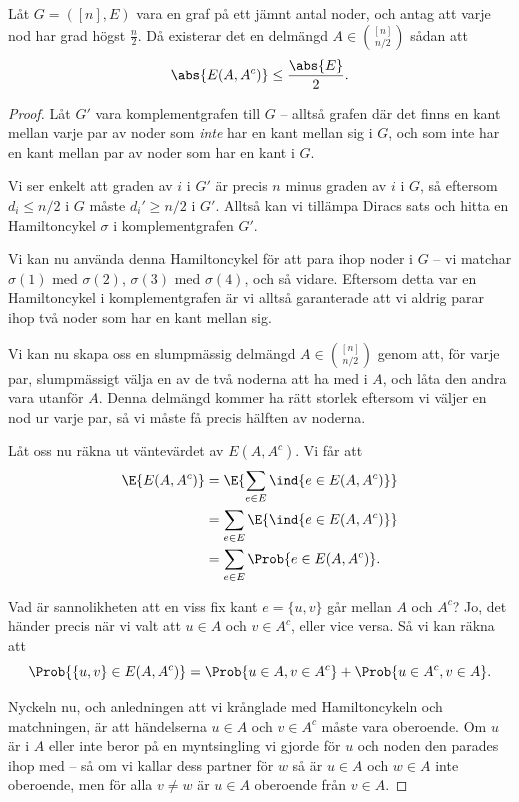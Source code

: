\documentclass[nobib]{tufte-handout}
\begin{document}
\begin{proposition}
  Låt $G = ([n], E)$ vara en graf på ett jämnt antal noder, och antag att varje nod har grad högst $\frac{n}{2}$. Då existerar det en delmängd $A \in \binom{[n]}{n/2}$ sådan att
  $$\abs{E(A, A^c)} \leq \frac{\abs{E}}{2}.$$ 

  \begin{proof}
    Låt $G'$ vara komplementgrafen till $G$ -- alltså grafen där det finns en kant mellan varje par av noder som \emph{inte} har en kant mellan sig i $G$, och som inte har en kant mellan par av noder som har en kant i $G$.

    Vi ser enkelt att graden av $i$ i $G'$ är precis $n$ minus graden av $i$ i $G$, så eftersom $d_i \leq n/2$ i $G$ måste $d_i' \geq n/2$ i $G'$. Alltså kan vi tillämpa Diracs sats och hitta en Hamiltoncykel $\sigma$ i komplementgrafen $G'$.

    Vi kan nu använda denna Hamiltoncykel för att para ihop noder i $G$ -- vi matchar $\sigma(1)$ med $\sigma(2)$, $\sigma(3)$ med $\sigma(4)$, och så vidare. Eftersom detta var en Hamiltoncykel i komplementgrafen är vi alltså garanterade att vi aldrig parar ihop två noder som har en kant mellan sig.

    Vi kan nu skapa oss en slumpmässig delmängd $A \in \binom{[n]}{n/2}$ genom att, för varje par, slumpmässigt välja en av de två noderna att ha med i $A$, och låta den andra vara utanför $A$. Denna delmängd kommer ha rätt storlek eftersom vi väljer en nod ur varje par, så vi måste få precis hälften av noderna.

    Låt oss nu räkna ut väntevärdet av $E(A, A^c)$. Vi får att
    \begin{align*}
      \E{E(A, A^c)} &= \E{\sum_{e \in E} \ind{e \in E(A, A^c)}}\\
      &= \sum_{e \in E} \E{\ind{e \in E(A, A^c)}}\\
      &= \sum_{e \in E} \Prob{e \in E(A, A^c)}.
    \end{align*}

    Vad är sannolikheten att en viss fix kant $e = \{u, v\}$ går mellan $A$ och $A^c$? Jo, det händer precis när vi valt att $u \in A$ och $v \in A^c$, eller vice versa. Så vi kan räkna att
    $$\Prob{\{u,v\} \in E(A, A^c)} = \Prob{u \in A, v \in A^c} + \Prob{u \in A^c, v \in A}.$$
    
    Nyckeln nu, och anledningen att vi krånglade med Hamiltoncykeln och matchningen, är att händelserna $u\in A$ och $v\in A^c$ måste vara oberoende. Om $u$ är i $A$ eller inte beror på en myntsingling vi gjorde för $u$ och noden den parades ihop med -- så om vi kallar dess partner för $w$ så är $u \in A$ och $w \in A$ inte oberoende, men för alla $v \neq w$ är $u \in A$ oberoende från $v \in A$.


\end{proof}
\end{proposition}
\end{document}
